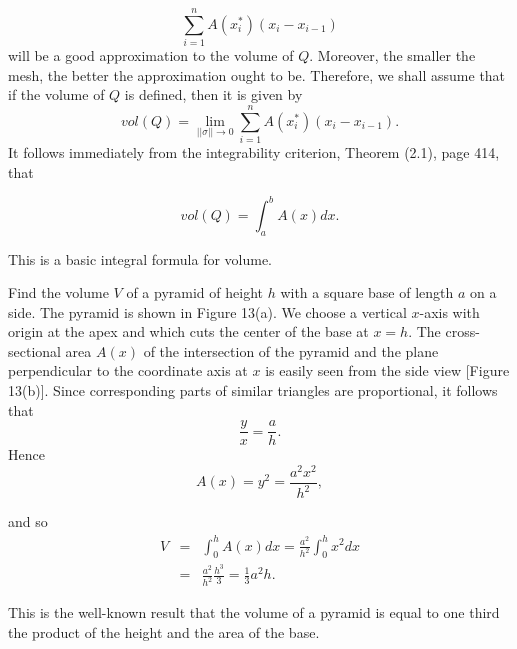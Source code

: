 
$$
\sum_{i=1}^n A(x_i^*)(x_i - x_{i-1})
$$
\noindent will be a good approximation to the volume of $Q$. Moreover, the smaller the mesh, the better the approximation ought to be. Therefore, we shall assume that if the volume of $Q$ is defined, then it is given by
$$
 vol(Q) = \lim_{|| \sigma || \rightarrow 0} \sum_{i=1}^n A(x_i^*)(x_i - x_{i-1}).  
$$
\noindent It follows immediately from the integrability criterion, Theorem (2.1), page 414, that

\begin{theorem} %
$$
vol(Q) = \int_a^b A(x)dx.  
$$
\end{theorem}

\noindent This is a basic integral formula for volume.



\begin{example}
Find the volume $V$ of a pyramid of height $h$ with a square base of length $a$ on a side. The pyramid is shown in Figure 13(a). We choose a vertical $x$-axis with origin at the apex and which cuts the center of the base at $x = h$. The cross-sectional area $A(x)$ of the intersection of the pyramid and the plane perpendicular to the coordinate axis at $x$ is easily seen from the side view [Figure 13(b)]. Since corresponding parts of similar triangles are proportional, it follows that 
$$
\frac{y}{ x} = \frac{a}{h} .
$$ 
\noindent Hence
$$
A(x) = y^2 = \frac{a^2 x^2}{h^2},
$$

\noindent and so
\begin{eqnarray*}
V &=& \int_0^h A(x) dx = \frac{a^2}{h^2} \int_0^h x^2 dx \\
&=& \frac{a^2}{h^2} \frac{h^3}{3} = \frac{1}{3} a^2h .
\end{eqnarray*}

\noindent This is the well-known result that the volume of a pyramid is equal to one third the product of the height and the area of the base.
\end{example}

